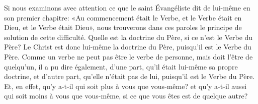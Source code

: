 Si nous examinons avec attention
	ce que le saint Évangéliste dit de lui-même en son premier chapitre:
	«Au commencement était le Verbe,
		et le Verbe était en Dieu, et le Verbe était Dieu»,
	nous trouverons dans ces paroles
		le principe de solution de cette difficulté.
Quelle est la doctrine du Père, si ce n’est le Verbe du Père?
	Le Christ est donc lui-même la doctrine du Père,
	puisqu’il est le Verbe du Père.
Comme un verbe ne peut pas être le verbe de personne,
		mais doit l’être de quelqu’un,
	il a pu dire également, d’une part, qu’il était lui-même sa propre doctrine,
	et d’autre part, qu’elle n’était pas de lui, puisqu’il est le Verbe du Père.
Et, en effet, qu’y a-t-il qui soit plus à vous que vous-même?
	et qu’y a-t-il aussi qui soit moins à vous que vous-même,
	si ce que vous êtes est de quelque autre?

